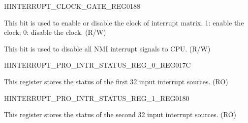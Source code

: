 \begin{register}{H}{INTERRUPT\_CLOCK\_GATE\_REG}{\hexprefix{}0188}\label{regdesc:INTERRUPTCLOCKGATEREG}
%
%
%
\regnewline%
\begin{regdesc}\begin{reglist}
\label{fielddesc:INTERRUPTCLKEN}\item [INTERRUPT\_CLK\_EN] This bit is used to enable or disable the clock of interrupt matrix. 1: enable the clock; 0: disable the clock. (R/W)
\label{fielddesc:INTERRUPTPRONMIMASKHW}\item [INTERRUPT\_PRO\_NMI\_MASK\_HW] This bit is used to disable all NMI interrupt signals to CPU. (R/W)
\end{reglist}\end{regdesc}
\end{register}


\begin{register}{H}{INTERRUPT\_PRO\_INTR\_STATUS\_REG\_0\_REG}{\hexprefix{}017C}\label{regdesc:INTERRUPTPROINTRSTATUSREG0REG}
%
\regnewline%
\begin{regdesc}\begin{reglist}
\label{fielddesc:INTERRUPTPROINTRSTATUS0}\item [INTERRUPT\_PRO\_INTR\_STATUS\_0] This register stores the status of the first 32 input interrupt sources. (RO)
\end{reglist}\end{regdesc}
\end{register}


\begin{register}{H}{INTERRUPT\_PRO\_INTR\_STATUS\_REG\_1\_REG}{\hexprefix{}0180}\label{regdesc:INTERRUPTPROINTRSTATUSREG1REG}
%
\regnewline%
\begin{regdesc}\begin{reglist}
\label{fielddesc:INTERRUPTPROINTRSTATUS1}\item [INTERRUPT\_PRO\_INTR\_STATUS\_1] This register stores the status of the second 32 input interrupt sources. (RO)
\end{reglist}\end{regdesc}
\end{register}


